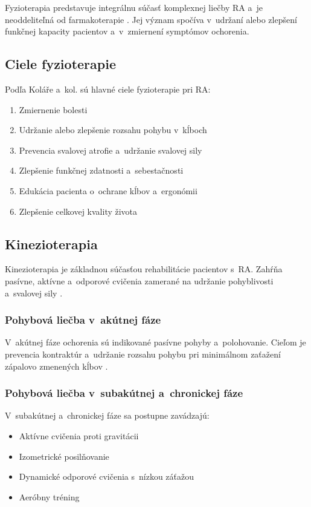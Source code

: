Fyzioterapia predstavuje integrálnu súčasť komplexnej liečby RA a~je neoddeliteľná od farmakoterapie \parencite{Kolar2012}. Jej význam spočíva v~udržaní alebo zlepšení funkčnej kapacity pacientov a~v~zmiernení symptómov ochorenia.

\subsection{Ciele fyzioterapie}

Podľa Koláře a~kol. \parencite*{Kolar2012} sú hlavné ciele fyzioterapie pri RA:
\begin{enumerate}
    \item Zmiernenie bolesti
    \item Udržanie alebo zlepšenie rozsahu pohybu v~kĺboch
    \item Prevencia svalovej atrofie a~udržanie svalovej sily
    \item Zlepšenie funkčnej zdatnosti a~sebestačnosti
    \item Edukácia pacienta o~ochrane kĺbov a~ergonómii
    \item Zlepšenie celkovej kvality života
\end{enumerate}

\subsection{Kinezioterapia}

Kinezioterapia je základnou súčasťou rehabilitácie pacientov s~RA. Zahŕňa pasívne, aktívne a~odporové cvičenia zamerané na udržanie pohyblivosti a~svalovej sily \parencite{Kolar2012}.

\subsubsection{Pohybová liečba v~akútnej fáze}

V~akútnej fáze ochorenia sú indikované pasívne pohyby a~polohovanie. Cieľom je prevencia kontraktúr a~udržanie rozsahu pohybu pri minimálnom zaťažení zápalovo zmenených kĺbov \parencite{Podebradsky2009}.

\subsubsection{Pohybová liečba v~subakútnej a~chronickej fáze}

V~subakútnej a~chronickej fáze sa postupne zavádzajú:
\begin{itemize}
    \item Aktívne cvičenia proti gravitácii
    \item Izometrické posilňovanie
    \item Dynamické odporové cvičenia s~nízkou záťažou
    \item Aeróbny tréning \parencite{hurkmans2009}
\end{itemize}

